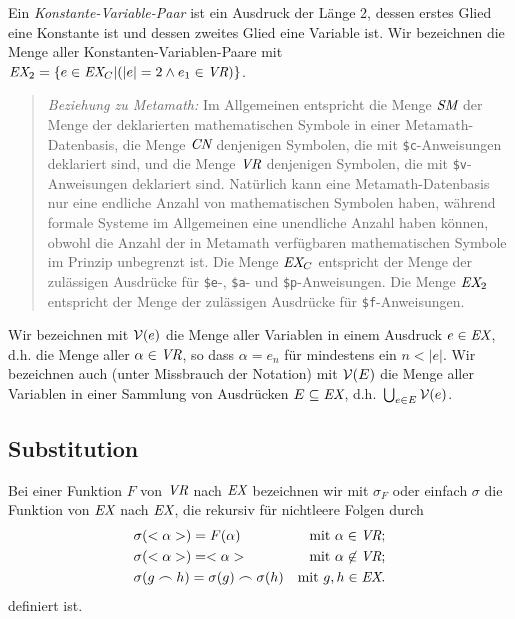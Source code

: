 Ein {\em Konstante-Variable-Paar} ist ein Ausdruck der Länge 2, dessen erstes Glied eine Konstante ist und dessen zweites Glied eine Variable ist.  Wir bezeichnen die Menge aller Konstanten-Variablen-Paare mit $\mbox{\em EX}_2 = \{ e \in \mbox{\em EX}_C | ( |e| = 2 \wedge e_1 \in \mbox{\em VR} ) \}$.


{\footnotesize\begin{quotation}
{\em Beziehung zu Metamath:} Im Allgemeinen entspricht die Menge $\mbox{\em SM}$ der Menge der deklarierten mathematischen Symbole in einer Metamath-Datenbasis, die Menge $\mbox{\em CN}$ denjenigen Symbolen, die mit \texttt{\$c}-Anweisungen deklariert sind, und die Menge $\mbox{\em VR}$ denjenigen Symbolen, die mit \texttt{\$v}-Anweisungen deklariert sind.  Natürlich kann eine Metamath-Datenbasis nur eine endliche Anzahl von mathematischen Symbolen haben, während formale Systeme im Allgemeinen eine unendliche Anzahl haben können, obwohl die Anzahl der in Metamath verfügbaren mathematischen Symbole im Prinzip unbegrenzt ist.  Die Menge $\mbox{\em EX}_C$ entspricht der Menge der zulässigen Ausdrücke für \texttt{\$e}-, \texttt{\$a}- und \texttt{\$p}-Anweisungen.  Die Menge $\mbox{\em EX}_2$ entspricht der Menge der zulässigen Ausdrücke für \texttt{\$f}-Anweisungen.
\end{quotation}}

Wir bezeichnen mit ${\cal V}(e)$ die Menge aller Variablen in einem Ausdruck $e \in \mbox{\em EX}$, d.h. die Menge aller $\alpha \in \mbox{\em VR}$, so dass $\alpha = e_n$ für mindestens ein $n < |e|$.  Wir bezeichnen auch (unter Missbrauch der Notation) mit ${\cal V}(E)$ die Menge aller Variablen in einer Sammlung von Ausdrücken $E \subseteq \mbox{\em EX}$, d.h.\ $\bigcup _{e \in E} {\cal V}(e)$.


\subsection{Substitution}

Bei einer Funktion $F$ von $\mbox{\em VR}$ nach $\mbox{\em EX}$ bezeichnen wir mit $\sigma_{F}$ oder einfach $\sigma$ die Funktion von $\mbox{\em EX}$ nach $\mbox{\em EX}$, die rekursiv für nichtleere Folgen durch
\begin{eqnarray*}
& \sigma(<\alpha>) = F(\alpha) & \mbox{mit\ } \alpha \in \mbox{\em VR}; \\
& \sigma(<\alpha>) = <\alpha> & \mbox{mit\ } \alpha \not\in \mbox{\em VR}; \\
& \sigma(g \frown h) = \sigma(g) \frown
    \sigma(h) & \mbox{mit\ } g,h \in \mbox{\em EX}.
\end{eqnarray*}
definiert ist.

